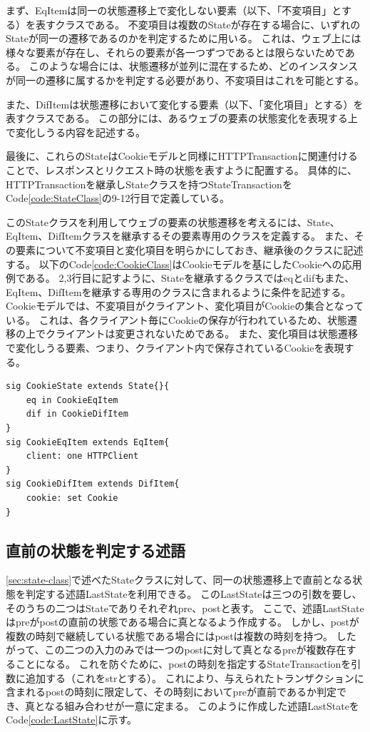 \documentclass[journal]{IEEEtran}
\begin{document}
まず、EqItemは同一の状態遷移上で変化しない要素（以下、「不変項目」とする）を表すクラスである。
不変項目は複数のStateが存在する場合に、いずれのStateが同一の遷移であるのかを判定するために用いる。
これは、ウェブ上には様々な要素が存在し、それらの要素が各一つずつであるとは限らないためである。
このような場合には、状態遷移が並列に混在するため、どのインスタンスが同一の遷移に属するかを判定する必要があり、不変項目はこれを可能とする。

また、DifItemは状態遷移において変化する要素（以下、「変化項目」とする）を表すクラスである。
この部分には、あるウェブの要素の状態変化を表現する上で変化しうる内容を記述する。

最後に、これらのStateはCookieモデルと同様にHTTPTransactionに関連付けることで、レスポンスとリクエスト時の状態を表すように配置する。
具体的に、HTTPTransactionを継承しStateクラスを持つStateTransactionをCode\ref{code:StateClass}の9-12行目で定義している。

このStateクラスを利用してウェブの要素の状態遷移を考えるには、State、EqItem、DifItemクラスを継承するその要素専用のクラスを定義する。
また、その要素について不変項目と変化項目を明らかにしておき、継承後のクラスに記述する。
以下のCode\ref{code:CookieClass}はCookieモデルを基にしたCookieへの応用例である。
2,3行目に記すように、Stateを継承するクラスではeqとdifもまた、EqItem、DifItemを継承する専用のクラスに含まれるように条件を記述する。
Cookieモデルでは、不変項目がクライアント、変化項目がCookieの集合となっている。
これは、各クライアント毎にCookieの保存が行われているため、状態遷移の上でクライアントは変更されないためである。
また、変化項目は状態遷移で変化しうる要素、つまり、クライアント内で保存されているCookieを表現する。
\begin{lstlisting}[caption=Cookieへの応用例, label=code:CookieClass]
sig CookieState extends State{}{
	eq in CookieEqItem
	dif in CookieDifItem
}
sig CookieEqItem extends EqItem{
	client: one HTTPClient
}
sig CookieDifItem extends DifItem{
	cookie: set Cookie
}
\end{lstlisting}

\subsection{直前の状態を判定する述語}
\ref{sec:state-class}で述べたStateクラスに対して、同一の状態遷移上で直前となる状態を判定する述語LastStateを利用できる。
このLastStateは三つの引数を要し、そのうちの二つはStateでありそれぞれpre、postと表す。
ここで、述語LastStateはpreがpostの直前の状態である場合に真となるよう作成する。
しかし、postが複数の時刻で継続している状態である場合にはpostは複数の時刻を持つ。
したがって、この二つの入力のみでは一つのpostに対して真となるpreが複数存在することになる。
これを防ぐために、postの時刻を指定するStateTransactionを引数に追加する（これをstrとする）。
これにより、与えられたトランザクションに含まれるpostの時刻に限定して、その時刻においてpreが直前であるか判定でき、真となる組み合わせが一意に定まる。
このように作成した述語LastStateをCode\ref{code:LastState}に示す。
\end{document}
